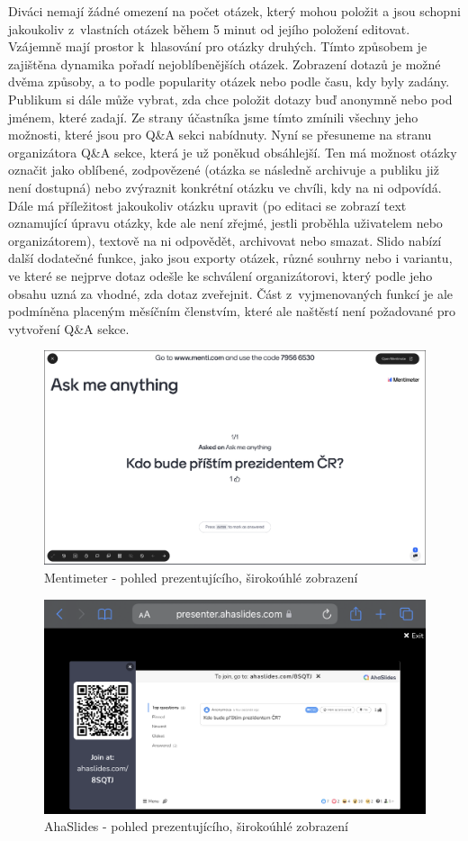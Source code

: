 Diváci nemají žádné omezení na počet otázek, který mohou položit a jsou schopni jakoukoliv z~vlastních otázek během 5 minut od jejího položení editovat. Vzájemně mají prostor k~hlasování pro otázky druhých. Tímto způsobem je zajištěna dynamika pořadí nejoblíbenějších otázek. Zobrazení dotazů je možné dvěma způsoby, a to podle popularity otázek nebo podle času, kdy byly zadány. Publikum si dále může vybrat, zda chce položit dotazy buď anonymně nebo pod jménem, které zadají. Ze strany účastníka jsme tímto zmínili všechny jeho možnosti, které jsou pro Q\&A sekci nabídnuty.  
Nyní se přesuneme na stranu organizátora Q\&A sekce, která je už poněkud obsáhlejší. Ten má možnost otázky označit jako oblíbené, zodpovězené (otázka se následně archivuje a publiku již není dostupná) nebo zvýraznit konkrétní otázku ve chvíli, kdy na ni odpovídá. Dále má příležitost jakoukoliv otázku upravit (po editaci se zobrazí text oznamující úpravu otázky, kde ale není zřejmé, jestli proběhla uživatelem nebo organizátorem), textově na ni odpovědět, archivovat nebo smazat. Slido nabízí další dodatečné funkce, jako jsou exporty otázek, různé souhrny nebo i variantu, ve které se nejprve dotaz odešle ke schválení organizátorovi, který podle jeho obsahu uzná za vhodné, zda dotaz zveřejnit. Část z~vyjmenovaných funkcí je ale podmíněna placeným měsíčním členstvím, které ale naštěstí není požadované pro vytvoření Q\&A sekce.

\begin{figure}
\centering
\includegraphics[width=.9\linewidth]{obrazky/mentimeter_admin.png}
\caption{Mentimeter - pohled prezentujícího, širokoúhlé zobrazení}
\label{fig:sub3}
\end{figure}

\begin{figure}
\centering
\includegraphics[width=.9\linewidth]{obrazky/aha_admin.png}
\caption{AhaSlides - pohled prezentujícího, širokoúhlé zobrazení}
\label{fig:sub4}
\end{figure}

